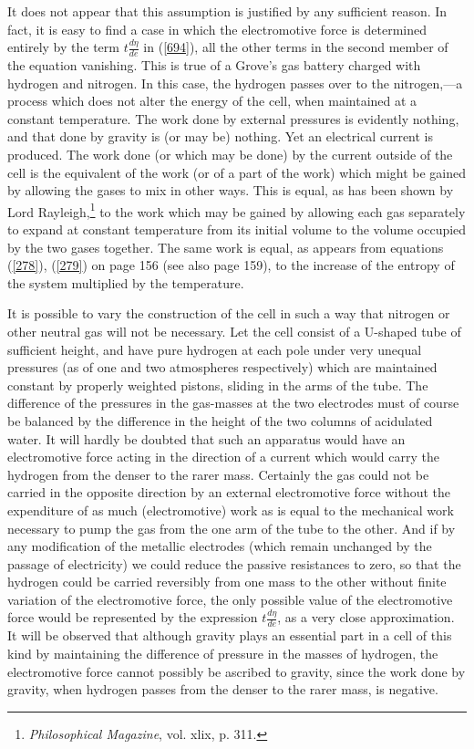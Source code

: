 \documentclass[12pt]{article}
\begin{document}
It does not appear that this assumption is justified by any sufficient reason. In fact, it is easy to find a case in which the electromotive force is determined entirely by the term $t\frac{d\eta}{de}$ in (\ref{694}), all the other terms in the second member of the equation vanishing. This is true of a Grove's gas battery charged with hydrogen and nitrogen. In this case, the hydrogen passes over to the nitrogen,---a process which does not alter the energy of the cell, when maintained at a constant temperature. The work done by external pressures is evidently nothing, and that done by gravity is (or may be) nothing. Yet an electrical current is produced. The work done (or which may be done) by the current outside of the cell is the equivalent of the work (or of a part of the work) which might be gained by allowing the gases to mix in other ways. This is equal, as has been shown by Lord Rayleigh,\footnote{\textit{Philosophical Magazine}, vol. xlix, p. 311.} to the work which may be gained by allowing each gas separately to expand at constant temperature from its initial volume to the volume occupied by the two gases together. The same work is equal, as appears from equations (\ref{278}), (\ref{279}) on page 156 (see also page 159), to the increase of the entropy of the system multiplied by the temperature.

It is possible to vary the construction of the cell in such a way that nitrogen or other neutral gas will not be necessary. Let the cell consist of a U-shaped tube of sufficient height, and have pure hydrogen at each pole under very unequal pressures (as of one and two atmospheres respectively) which are maintained constant by properly weighted pistons, sliding in the arms of the tube. The difference of the pressures in the gas-masses at the two electrodes must of course be balanced by the difference in the height of the two columns of acidulated water. It will hardly be doubted that such an apparatus would have an electromotive force acting in the direction of a current which would carry the hydrogen from the denser to the rarer mass. Certainly the gas could not be carried in the opposite direction by an external electromotive force without the expenditure of as much (electromotive) work as is equal to the mechanical work necessary to pump the gas from the one arm of the tube to the other. And if by any modification of the metallic electrodes (which remain unchanged by the passage of electricity) we could reduce the passive resistances to zero, so that the hydrogen could be carried reversibly from one mass to the other without finite variation of the electromotive force, the only possible value of the electromotive force would be represented by the expression $t\frac{d\eta}{de}$, as a very close approximation. It will be observed that although gravity plays an essential part in a cell of this kind by maintaining the difference of pressure in the masses of hydrogen, the electromotive force cannot possibly be ascribed to gravity, since the work done by gravity, when hydrogen passes from the denser to the rarer mass, is negative.
\end{document}
